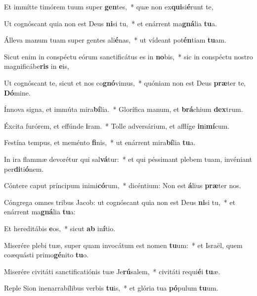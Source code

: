 \item Et immítte timórem tuum super \textbf{gen}tes,~* quæ non ex\textbf{qui}si\textbf{é}runt te,
\item Ut cognóscant quia non est Deus \textbf{ni}si tu,~* et enárrent ma\textbf{gná}lia \textbf{tu}a.
\item Álleva manum tuam super gentes ali\textbf{é}nas,~* ut vídeant pot\textbf{én}tiam \textbf{tu}am.
\item Sicut enim in conspéctu eórum sanctificátus es in \textbf{no}bis,~* sic in conspéctu nostro magnificábe\textbf{ris} in \textbf{e}is,
\item Ut cognóscant te, sicut et nos co\textbf{gnó}vimus,~* quóniam non est Deus \textbf{præ}ter te, \textbf{Dó}mine.
\item Ínnova signa, et immúta mira\textbf{bí}lia.~* Glorífica manum, et \textbf{brá}chium \textbf{dex}trum.
\item Éxcita furórem, et effúnde \textbf{i}ram.~* Tolle adversárium, et afflíge \textbf{in}i\textbf{mí}cum.
\item Festína tempus, et meménto \textbf{fi}nis,~* ut enárrent mira\textbf{bí}lia \textbf{tu}a.
\item In ira flammæ devorétur qui sal\textbf{vá}tur:~* et qui péssimant plebem tuam, invéniant per\textbf{di}ti\textbf{ó}nem.
\item Cóntere caput príncipum inimi\textbf{có}rum,~* dicéntium: Non est \textbf{á}lius \textbf{præ}ter nos.
\item Cóngrega omnes tribus Jacob: ut cognóscant quia non est Deus \textbf{ni}si tu,~* et enárrent ma\textbf{gná}lia \textbf{tu}a:
\item Et hereditábis \textbf{e}os,~* sicut \textbf{ab} in\textbf{í}tio.
\item Miserére plebi tuæ, super quam invocátum est nomen \textbf{tu}um:~* et Israël, quem coæquásti primo\textbf{gé}nito \textbf{tu}o.
\item Miserére civitáti sanctificatiónis tuæ Je\textbf{rú}salem,~* civitáti requi\textbf{é}i \textbf{tu}æ.
\item Reple Sion inenarrabílibus verbis \textbf{tu}is,~* et glória tua \textbf{pó}pulum \textbf{tu}um.
